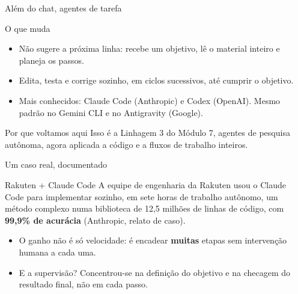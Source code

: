 \documentclass[11pt,aspectratio=169,t]{beamer}
\begin{document}
\begin{frame}{Além do chat, agentes de tarefa}
  \small
  \begin{block}{O que muda}
    \begin{itemize}
      \item Não sugere a próxima linha: recebe um objetivo, lê o material inteiro e planeja os passos.
      \item Edita, testa e corrige sozinho, em ciclos sucessivos, até cumprir o objetivo.
      \item Mais conhecidos: Claude Code (Anthropic) e Codex (OpenAI). Mesmo padrão no Gemini CLI e no Antigravity (Google).
    \end{itemize}
  \end{block}
  \pause
  \vfill
  \begin{alertblock}{Por que voltamos aqui}
    \centering Isso é a Linhagem 3 do Módulo 7, agentes de pesquisa autônoma, agora aplicada a código e a fluxos de trabalho inteiros.
  \end{alertblock}
\end{frame}

\begin{frame}{Um caso real, documentado}
  \begin{exampleblock}{Rakuten + Claude Code}
    A equipe de engenharia da Rakuten usou o Claude Code para implementar sozinho, em sete horas de trabalho autônomo, um método complexo numa biblioteca de 12,5 milhões de linhas de código, com \textbf{99,9\% de acurácia} (Anthropic, relato de caso).
  \end{exampleblock}
  \pause
  \vfill
  \begin{itemize}
    \item O ganho não é só velocidade: é encadear \textbf{muitas} etapas sem intervenção humana a cada uma.
    \item \alert{E a supervisão?} Concentrou-se na definição do objetivo e na checagem do resultado final, não em cada passo.
  \end{itemize}
\end{frame}
\end{document}
